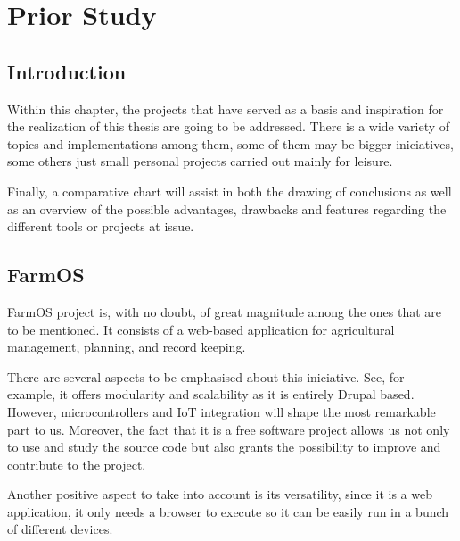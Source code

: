 \chapter{Prior Study}\label{cap:planificación}

\section{Introduction}
Within this chapter, the projects that have served as a basis and inspiration for the realization of this thesis are going to be addressed. There is a wide variety of topics and implementations among them, some of them may be bigger iniciatives, some others just small personal projects carried out mainly for leisure.

Finally, a comparative chart will assist in both the drawing of conclusions as well as an overview of the possible advantages, drawbacks and features regarding the different tools or projects at issue.

\section{FarmOS}
FarmOS project is, with no doubt, of great magnitude among the ones that are to be mentioned. It consists of a web-based application for agricultural management, planning, and record keeping.

There are several aspects to be emphasised about this iniciative. See, for example, it offers modularity and scalability as it is entirely Drupal based. However, microcontrollers and IoT integration will shape the most remarkable part to us. Moreover, the fact that it is a free software project allows us not only to use and study the source code but also grants the possibility to improve and contribute to the project.

Another positive aspect to take into account is its versatility, since it is a web application, it only needs a browser to execute so it can be easily run in a bunch of different devices.

